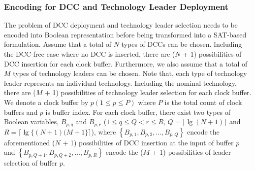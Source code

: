 \subsubsection{Encoding for DCC and Technology Leader Deployment}
\label{sec:TVA:leader_encode}
The problem of DCC deployment and technology leader selection needs to be encoded into Boolean representation before being transformed into a SAT-based formulation. Assume that a total of $N$ types of DCCs can be chosen. Including the DCC-free case where no DCC is inserted, there are ($N$ + 1) possibilities of DCC insertion for each clock buffer. Furthermore, we also assume that a total of $M$ types of technology leaders can be chosen. Note that, each type of technology leader represents an individual technology. Including the nominal technology, there are ($M$ + 1) possibilities of technology leader selection for each clock buffer. We denote a clock buffer by $p\left(1 \leq p \leq P\right)$ where $P$ is the total count of clock buffers and $p$ is buffer index. For each clock buffer, there exist two types of Boolean variables, $B_{p,q}$ and $B_{p,r}$ ($1 \leq q \leq Q < r \leq R$, $Q = \lceil \lg (N + 1)\rceil$ and $R = \lceil \lg \{(N + 1)(M + 1\}\rceil$), where $\left\{B_{p,1}, B_{p,2},\dotsc, B_{p,Q}\right\}$ encode the aforementioned ($N$ + 1) possibilities of DCC insertion at the input of buffer $p$ and $\left\{B_{p,Q+1}, B_{p,Q+2},\dotsc, B_{p,R}\right\}$ encode the ($M$ + 1) possibilities of leader selection of buffer $p$.


